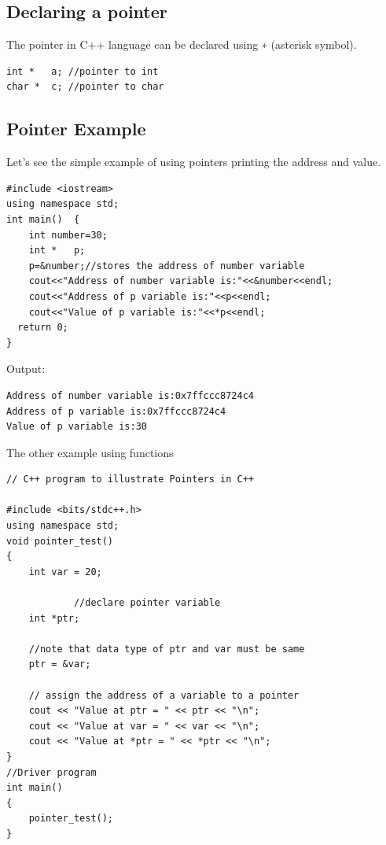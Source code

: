 \documentclass{book}
\begin{document}
\subsection{Declaring a pointer}

The pointer in C++ language can be declared using ∗ (asterisk symbol).

\begin{verbatim}
int *   a; //pointer to int    
char *  c; //pointer to char    
\end{verbatim}

\subsection{Pointer Example}

Let's see the simple example of using pointers printing the address and value.

\begin{lstlisting}
#include <iostream>  
using namespace std;  
int main()  {  
	int number=30;    
	int *   p;      
	p=&number;//stores the address of number variable    
	cout<<"Address of number variable is:"<<&number<<endl;    
	cout<<"Address of p variable is:"<<p<<endl;    
	cout<<"Value of p variable is:"<<*p<<endl;    
  return 0;  
}  
\end{lstlisting}

Output:

\begin{verbatim}
Address of number variable is:0x7ffccc8724c4
Address of p variable is:0x7ffccc8724c4
Value of p variable is:30  

\end{verbatim}

The other example using functions 

\begin{lstlisting}
// C++ program to illustrate Pointers in C++
  
#include <bits/stdc++.h>
using namespace std;
void pointer_test()
{
	int var = 20; 
		
			//declare pointer variable    
	int *ptr; 
		
	//note that data type of ptr and var must be same
	ptr = &var;    

	// assign the address of a variable to a pointer
	cout << "Value at ptr = " << ptr << "\n";
	cout << "Value at var = " << var << "\n";
	cout << "Value at *ptr = " << *ptr << "\n";     
}
//Driver program
int main()
{
	pointer_test();
}
\end{lstlisting}
\end{document}
